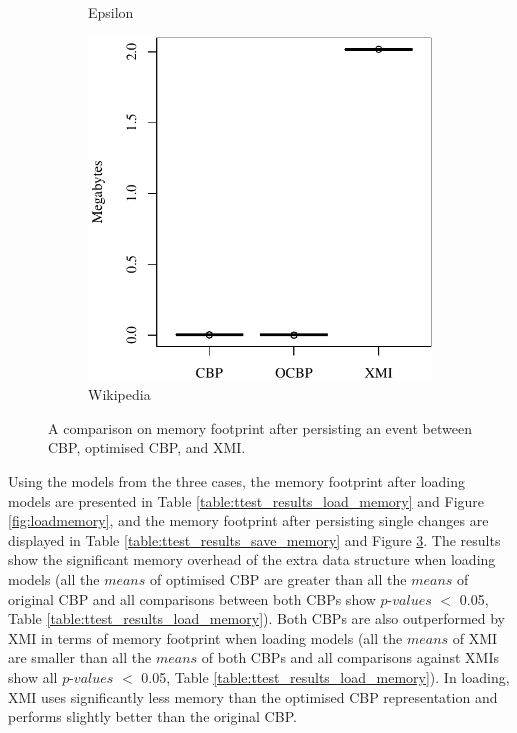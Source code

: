 {\begin{figure}[ht]
\begin{subfigure}{0.325\textwidth}
    \caption{Epsilon}
    \label{fig:save_memory_epsilon}
  \end{subfigure}
  \hfill
  \begin{subfigure}{0.325\textwidth}
    \centering
    \includegraphics[width=\linewidth]{images/ol_save_memory_wikipedia}
    \caption{Wikipedia}
    \label{fig:save_memory_wikipedia}
  \end{subfigure}
  \caption{A comparison on memory footprint after persisting an event between CBP, optimised CBP, and XMI.}
  \label{fig:savememory}
\end{figure}

Using the models from the three cases, the memory footprint after loading models are presented in Table \ref{table:ttest_results_load_memory} and Figure \ref{fig:loadmemory}, and the memory footprint after persisting single changes are displayed in Table \ref{table:ttest_results_save_memory} and Figure \ref{fig:savememory}. The results show the significant memory overhead of the extra data structure when loading models (all the $means$ of optimised CBP are greater than all the $means$ of original CBP and all comparisons between both CBPs show $p$-$values$ $<$ 0.05, Table \ref{table:ttest_results_load_memory}). Both CBPs are also outperformed by XMI in terms of memory footprint when loading models (all the $means$ of XMI are smaller than all the $means$ of both CBPs and all comparisons against XMIs show all $p$-$values$ $<$ 0.05, Table \ref{table:ttest_results_load_memory}). In loading, XMI uses significantly less memory than the optimised CBP representation and performs slightly better than the original CBP.   

}
